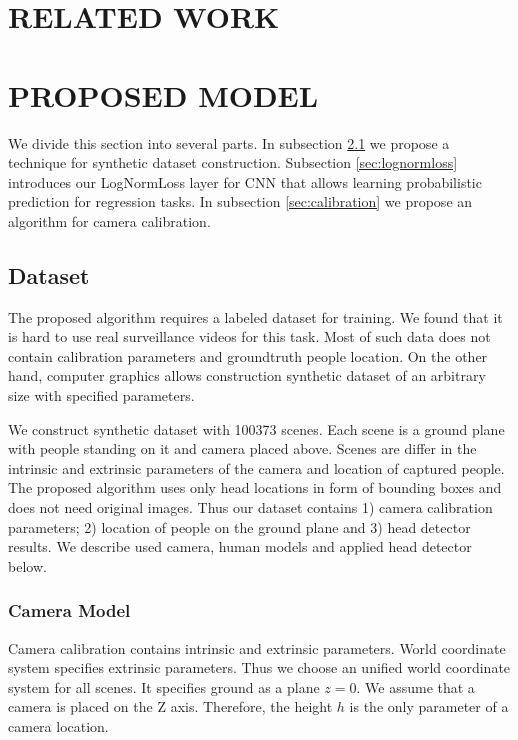 \section{\uppercase{Related Work}}
\label{sec:related}

\noindent 

\section{\uppercase{Proposed Model}}
\label{sec:proposed}

\noindent We divide this section into several parts. In subsection \ref{sec:dataset} we propose a technique for synthetic dataset construction. Subsection \ref{sec:lognormloss} introduces our LogNormLoss layer for CNN that allows learning probabilistic prediction for regression tasks. In subsection \ref{sec:calibration} we propose an algorithm for camera calibration.

\subsection{Dataset}
\label{sec:dataset}

\noindent The proposed algorithm requires a labeled dataset for training. We found that it is hard to use real surveillance videos for this task. Most of such data does not contain calibration parameters and groundtruth people location. On the other hand, computer graphics allows construction synthetic dataset of an arbitrary size with specified parameters.

We construct synthetic dataset with 100373 scenes. Each scene is a ground plane with people standing on it and camera placed above. Scenes are differ in the intrinsic and extrinsic parameters of the camera and location of captured people. The proposed algorithm uses only head locations in form of bounding boxes and does not need original images. Thus our dataset contains 1) camera calibration parameters; 2) location of people on the ground plane and 3) head detector results. We describe used camera, human models and applied head detector below.

\subsubsection{Camera Model}

\noindent Camera calibration contains intrinsic and extrinsic parameters. World coordinate system specifies extrinsic parameters. Thus we choose an unified world coordinate system for all scenes. It specifies ground as a plane $z = 0$. We assume that a camera is placed on the Z axis. Therefore, the height $h$ is the only parameter of a camera location.

